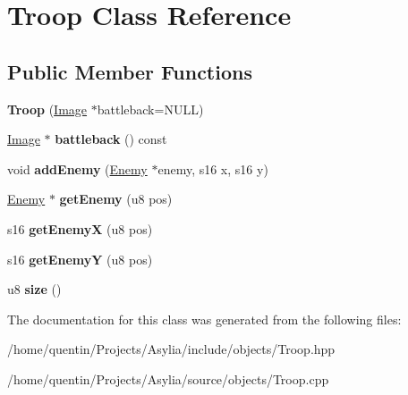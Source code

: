 \hypertarget{classTroop}{\section{Troop Class Reference}
\label{classTroop}
}
\subsection*{Public Member Functions}
\begin{DoxyCompactItemize}
\item 
\hypertarget{classTroop_ae8c6302f0c441f2705cc479f6bef01a2}{{\bfseries Troop} (\hyperlink{classImage}{Image} $\ast$battleback=N\-U\-L\-L)}\label{classTroop_ae8c6302f0c441f2705cc479f6bef01a2}

\item 
\hypertarget{classTroop_ad747c6ae6caa4013d05835db28858c7b}{\hyperlink{classImage}{Image} $\ast$ {\bfseries battleback} () const }\label{classTroop_ad747c6ae6caa4013d05835db28858c7b}

\item 
\hypertarget{classTroop_a931da8e3b88bbd755bb1d7e636b76330}{void {\bfseries add\-Enemy} (\hyperlink{classEnemy}{Enemy} $\ast$enemy, s16 x, s16 y)}\label{classTroop_a931da8e3b88bbd755bb1d7e636b76330}

\item 
\hypertarget{classTroop_a425971336ea0a55c4fe19ffdabaa1e5a}{\hyperlink{classEnemy}{Enemy} $\ast$ {\bfseries get\-Enemy} (u8 pos)}\label{classTroop_a425971336ea0a55c4fe19ffdabaa1e5a}

\item 
\hypertarget{classTroop_a79e2700df4e1628351ff2f19c7d37545}{s16 {\bfseries get\-Enemy\-X} (u8 pos)}\label{classTroop_a79e2700df4e1628351ff2f19c7d37545}

\item 
\hypertarget{classTroop_ad09bc365656cef0efc4fe34f0e4a0d30}{s16 {\bfseries get\-Enemy\-Y} (u8 pos)}\label{classTroop_ad09bc365656cef0efc4fe34f0e4a0d30}

\item 
\hypertarget{classTroop_a7ff2cb2e7cf34acd7ba8c286b2d87c62}{u8 {\bfseries size} ()}\label{classTroop_a7ff2cb2e7cf34acd7ba8c286b2d87c62}

\end{DoxyCompactItemize}


The documentation for this class was generated from the following files\-:\begin{DoxyCompactItemize}
\item 
/home/quentin/\-Projects/\-Asylia/include/objects/Troop.\-hpp\item 
/home/quentin/\-Projects/\-Asylia/source/objects/Troop.\-cpp\end{DoxyCompactItemize}
